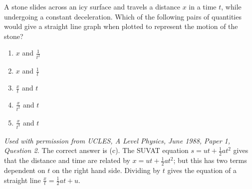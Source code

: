 \begin{problem}[A1988PIQ2l] 
{A stone slides across an icy surface and travels a distance $x$ in a time $t$, while undergoing a constant deceleration. Which of the following pairs of quantities would give a straight line graph when plotted to represent the motion of the stone?
\begin{enumerate}
	\item $x$ and $\frac{1}{t^{2}}$
	\item $x$ and $\frac{1}{t}$
	\item $\frac{x}{t}$ and $t$
	\item $\frac{x}{t^{2}}$ and $t$
	\item $\frac{x}{t^{3}}$ and $t$
\end{enumerate}
}
{\textit{Used with permission from UCLES, A Level Physics, June 1988, Paper 1, Question 2.}}
{The correct answer is (c). The SUVAT equation $s = ut + \frac{1}{2}at^{2}$ gives that the distance and time are related by $x = ut + \frac{1}{2}at^{2}$; but this has two terms dependent on $t$ on the right hand side. Dividing by $t$ gives the equation of a straight line $\frac{x}{t} = \frac{1}{2}at + u$.}
\end{problem}